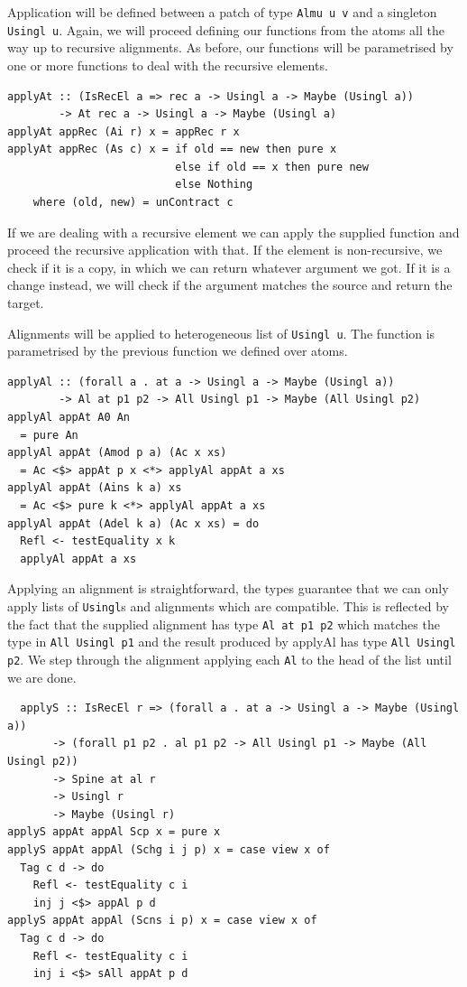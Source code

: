 \documentclass[11pt, titlepage]{article}
\begin{document}
Application will be defined between a patch of type \texttt{Almu u v} and a 
singleton \texttt{Usingl u}. 
Again, we will proceed defining our functions from the atoms all the way up to 
recursive alignments. As before, our functions will be parametrised by one or 
more functions to deal with the recursive elements. 

\begin{verbatim}
applyAt :: (IsRecEl a => rec a -> Usingl a -> Maybe (Usingl a))
        -> At rec a -> Usingl a -> Maybe (Usingl a)
applyAt appRec (Ai r) x = appRec r x
applyAt appRec (As c) x = if old == new then pure x
                          else if old == x then pure new
                          else Nothing
    where (old, new) = unContract c  
\end{verbatim}

If we are dealing with a recursive element we can apply the supplied function 
and proceed the recursive application with that.
If the element is non-recursive, we check if it is a copy, in which we can 
return whatever argument we got. If it is a change instead, we will check if the 
argument matches the source and return the target.

Alignments will be applied to heterogeneous list of \texttt{Usingl u}. The function is parametrised by the previous function we defined over atoms.

\begin{verbatim}
applyAl :: (forall a . at a -> Usingl a -> Maybe (Usingl a))
        -> Al at p1 p2 -> All Usingl p1 -> Maybe (All Usingl p2)
applyAl appAt A0 An
  = pure An
applyAl appAt (Amod p a) (Ac x xs)
  = Ac <$> appAt p x <*> applyAl appAt a xs
applyAl appAt (Ains k a) xs
  = Ac <$> pure k <*> applyAl appAt a xs
applyAl appAt (Adel k a) (Ac x xs) = do
  Refl <- testEquality x k
  applyAl appAt a xs
\end{verbatim}

Applying an alignment is straightforward, the types guarantee that we can only 
apply lists of \texttt{Usingl}s and alignments which are compatible. This is 
reflected by the fact that the supplied alignment has type \texttt{Al at p1 p2} 
which matches the type in \texttt{All Usingl p1} and the result produced by 
applyAl has type \texttt{All Usingl p2}. We step through the alignment applying 
each \texttt{Al} to the head of the list until we are done.

\begin{verbatim}
  applyS :: IsRecEl r => (forall a . at a -> Usingl a -> Maybe (Usingl a))
       -> (forall p1 p2 . al p1 p2 -> All Usingl p1 -> Maybe (All Usingl p2))
       -> Spine at al r
       -> Usingl r
       -> Maybe (Usingl r)
applyS appAt appAl Scp x = pure x
applyS appAt appAl (Schg i j p) x = case view x of
  Tag c d -> do
    Refl <- testEquality c i
    inj j <$> appAl p d
applyS appAt appAl (Scns i p) x = case view x of
  Tag c d -> do
    Refl <- testEquality c i
    inj i <$> sAll appAt p d
\end{verbatim}
\end{document}
